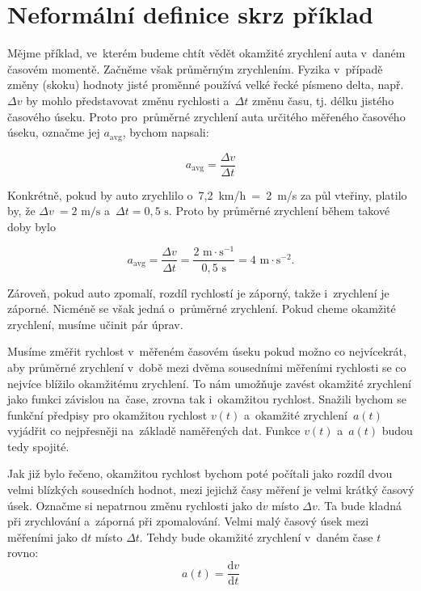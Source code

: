 \vfill{}
\pagebreak
\section{Neformální definice skrz příklad}

Mějme příklad, ve~kterém budeme chtít vědět okamžité zrychlení auta v~daném časovém momentě. Začněme však průměrným zrychlením. Fyzika v~případě změny (skoku) hodnoty jisté proměnné používá velké řecké písmeno delta, např. $\Delta v$ by mohlo představovat změnu rychlosti a~$\Delta t$ změnu času, tj. délku jistého časového úseku. Proto pro~průměrné zrychlení auta určitého měřeného časového úseku, označme jej $a_{\text{avg}}$,  bychom napsali:

\begin{equation*}
    a_{\text{avg}} = \frac{\Delta v}{\Delta t}
\end{equation*}

Konkrétně, pokud by auto zrychlilo o~7,2~km/h~=~2~m/s za půl vteřiny, platilo by, že $\Delta v~= {2 \text{ m}/\text{s}}$ a~$\Delta t = {0,5 \text{ s}}$. Proto by průměrné zrychlení během takové doby bylo

\begin{equation*}
    a_{\text{avg}}
    = \frac{\Delta v}{\Delta t}
    = \frac{2 \text{ m} \cdot \text{s}^{-1}}{0,5 \text{ s}}
    = 4 \text{ m} \cdot \text{s}^{-2}\text{.}
\end{equation*}

Zároveň, pokud auto zpomalí, rozdíl rychlostí je záporný, takže i~zrychlení je záporné. Nicméně se však jedná o~průměrné zrychlení. Pokud cheme okamžité zrychlení, musíme učinit pár úprav.

Musíme změřit rychlost v~měřeném časovém úseku pokud možno co nejvícekrát, aby průměrné zrychlení v~době mezi dvěma sousedními měřeními rychlosti se co nejvíce blížilo okamžitému zrychlení. To nám umožňuje zavést okamžité zrychlení jako funkci závislou na~čase, zrovna tak i~okamžitou rychlost. Snažili bychom se funkční předpisy pro okamžitou rychlost $v(t)$ a~okamžité zrychlení~$a(t)$ vyjádřit co nejpřesněji na~základě naměřených dat. Funkce $v(t)$ a~$a(t)$ budou tedy spojité.

Jak již bylo řečeno, okamžitou rychlost bychom poté počítali jako rozdíl dvou velmi blízkých sousedních hodnot, mezi jejichž časy měření je velmi krátký časový úsek. Označme si nepatrnou změnu rychlosti jako $\text{d} v$ místo $\Delta v$. Ta bude kladná při zrychlování a~záporná při zpomalování. Velmi malý časový úsek mezi měřeními jako $\text{d} t$ místo $\Delta t$. Tehdy bude okamžité zrychlení v~daném čase $t$ rovno:
\begin{equation*}
    a(t) = \frac{\text{d}v}{\text{d}t}
\end{equation*}

